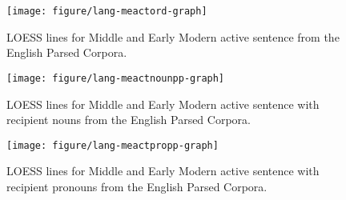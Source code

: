 \begin{knitrout}
\color{fgcolor}\begin{kframe}


{\ttfamily\noindent\color{warningcolor}{\#\# Warning: Removed 1 rows containing missing values (stat\_smooth).\\\#\# Warning: Removed 1 rows containing missing values (stat\_smooth).\\\#\# Warning: Removed 1 rows containing missing values (geom\_point).\\\#\# Warning: Removed 1 rows containing missing values (geom\_point).}}\end{kframe}\begin{figure}[p!]


{\centering \texttt{[image: figure/lang-meactord-graph]} 

}

\caption[LOESS lines for Middle and Early Modern active sentence from the English Parsed Corpora]{LOESS lines for Middle and Early Modern active sentence from the English Parsed Corpora.\label{fig:mengactgraph}\label{fig:meactord-graph}}
\end{figure}


\end{knitrout}

\begin{knitrout}
\color{fgcolor}\begin{figure}[p!]


{\centering \texttt{[image: figure/lang-meactnounpp-graph]} 

}

\caption[LOESS lines for Middle and Early Modern active sentence with recipient nouns from the English Parsed Corpora]{LOESS lines for Middle and Early Modern active sentence with recipient nouns from the English Parsed Corpora.\label{fig:mengactgraph}\label{fig:meactnounpp-graph}}
\end{figure}


\end{knitrout}

\begin{knitrout}
\color{fgcolor}\begin{figure}[p!]


{\centering \texttt{[image: figure/lang-meactpropp-graph]} 

}

\caption[LOESS lines for Middle and Early Modern active sentence with recipient pronouns from the English Parsed Corpora]{LOESS lines for Middle and Early Modern active sentence with recipient pronouns from the English Parsed Corpora.\label{fig:mengactgraph}\label{fig:meactpropp-graph}}
\end{figure}


\end{knitrout}
